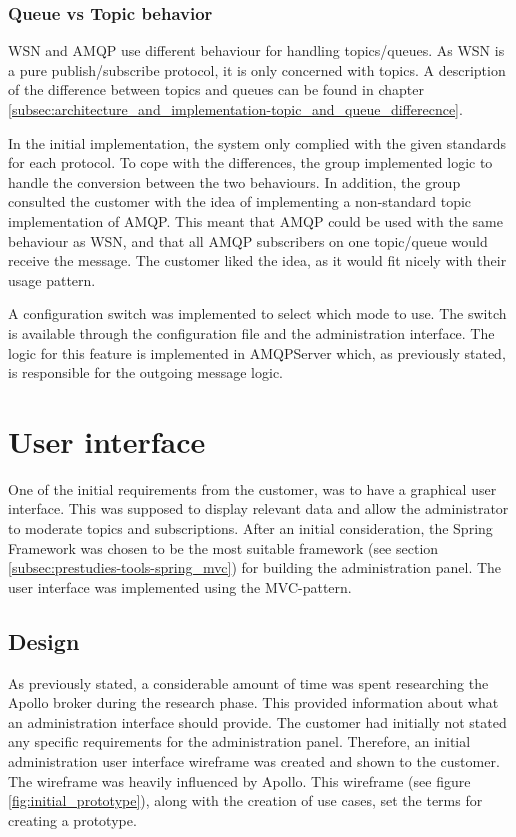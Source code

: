 \subsubsection{Queue vs Topic behavior}
WSN and AMQP use different behaviour for handling topics/queues. As WSN is a pure publish/subscribe protocol, it is only concerned with topics. A description of the difference between topics and queues can be found in chapter \ref{subsec:architecture_and_implementation-topic_and_queue_differecnce}.

In the initial implementation, the system only complied with the given standards for each protocol. To cope with the differences, the group implemented logic to handle the conversion between the two behaviours. In addition, the group consulted the customer with the idea of implementing a non-standard topic implementation of AMQP. This meant that AMQP could be used with the same behaviour as WSN, and that all AMQP subscribers on one topic/queue would receive the message. The customer liked the idea, as it would fit nicely with their usage pattern. 

A configuration switch was implemented to select which mode to use. The switch is available through the configuration file and the administration interface. The logic for this feature is implemented in AMQPServer which, as previously stated, is responsible for the outgoing message logic.


\section{User interface}
\label{sec:architecture_and_implementation-user_interface}

One of the initial requirements from the customer, was to have a graphical user interface. This was supposed to display relevant data and allow the administrator to moderate topics and subscriptions. After an initial consideration, the Spring Framework was chosen to be the most suitable framework (see section  \ref{subsec:prestudies-tools-spring_mvc}) for building the administration panel. The user interface was implemented using the MVC-pattern. 

\subsection{Design}
\label{subsec:architecture_and_implementation-user_interface-design}

As previously stated, a considerable amount of time was spent researching the Apollo broker during the research phase. This provided information about what an administration interface should provide. The customer had initially not stated any specific requirements for the administration panel. Therefore, an initial administration user interface wireframe was created and shown to the customer. The wireframe was heavily influenced by Apollo. This wireframe (see figure \ref{fig:initial_prototype}), along with the creation of use cases, set the terms for creating a prototype.

